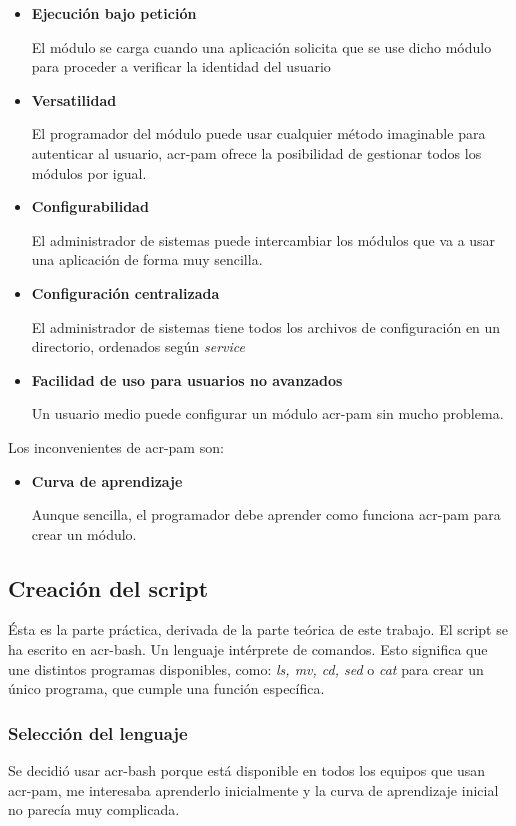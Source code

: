 \documentclass[twoside, titlepage, 12pt, a4paper]{article}
\begin{document}
{\begin{itemize}
		Al ser un módulo tan extendido, esto significa que prácticamente cualquier usuario de \gls{GNU/Linux} e incluso MacOS puede disfrutar de las ventajas del \gls{acr-dfa}
	\item{\textbf{Ejecución bajo petición}}\par
		El módulo se carga cuando una aplicación solicita que se use dicho módulo para proceder a verificar la identidad del usuario
	\item{\textbf{Versatilidad}}\par
		El programador del módulo puede usar cualquier método imaginable para autenticar al usuario, \gls{acr-pam} ofrece la posibilidad de gestionar todos los módulos por igual.
	\item{\textbf{Configurabilidad}}\par
		El administrador de sistemas puede intercambiar los módulos que va a usar una aplicación de forma muy sencilla.
	\item{\textbf{Configuración centralizada}}\par
		El administrador de sistemas tiene todos los archivos de configuración en un directorio, ordenados según \textit{service}
	\item{\textbf{Facilidad de uso para usuarios no avanzados}}\par
		Un usuario medio puede configurar un módulo \gls{acr-pam} sin mucho problema.
\end{itemize}
Los inconvenientes de \gls{acr-pam} son:
\begin{itemize}
	\item{\textbf{Curva de aprendizaje}}\par
		Aunque sencilla, el programador debe aprender como funciona \gls{acr-pam} para crear un módulo.
\end{itemize}
\subsection{Creación del \gls{script}}
Ésta es la parte práctica, derivada de la parte teórica de este trabajo. El \gls{script} se ha escrito en \gls{acr-bash}. Un lenguaje intérprete de comandos. Esto significa que une distintos programas disponibles, como: \textit{ls, mv, cd, sed} o \textit{cat} para crear un único programa, que cumple una función específica.\par
\subsubsection{Selección del lenguaje}
Se decidió usar \gls{acr-bash} porque está disponible en todos los equipos que usan \gls{acr-pam}, me interesaba aprenderlo inicialmente y la curva de aprendizaje inicial no parecía muy complicada.\par
}
\end{document}
